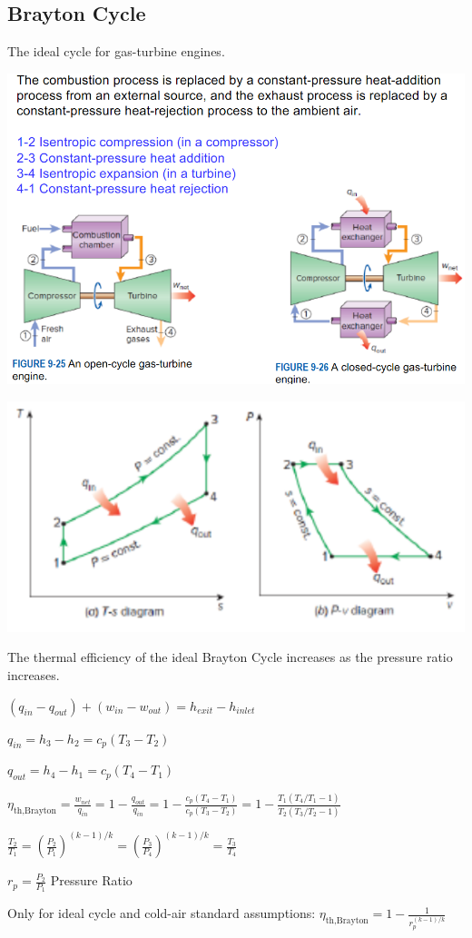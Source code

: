 \documentclass{article}
\begin{document}
\begin{multicols}{3}
    \subsection*{Brayton Cycle}
    The ideal cycle for gas-turbine engines.\par 
    \includegraphics[width=\linewidth]{Images/Brayton.png}\par 
    \includegraphics[width=\linewidth]{Images/Brayton2.png}\par 
    The thermal efficiency of the ideal Brayton Cycle increases as the pressure ratio increases.\par
    $(q_{in}-q_{out})+(w_{in}-w_{out})=h_{exit}-h_{inlet}$\par 
    $q_{in}=h_3-h_2=c_p(T_3-T_2)$\par 
    $q_{out}=h_4-h_1=c_p(T_4-T_1)$\par 
    $\eta_\text{th,Brayton}=\frac{w_{net}}{q_{in}}=1-\frac{q_{out}}{q_{in}}=1-\frac{c_p(T_4-T_1)}{c_p(T_3-T_2)}=1-\frac{T_1(T_4/T_1-1)}{T_2(T_3/T_2-1)}$\par 
    $\frac{T_2}{T_1}=\left(\frac{P_2}{P_1}\right)^{(k-1)/k}=\left(\frac{P_3}{P_4}\right)^{(k-1)/k}=\frac{T_3}{T_4}$\par 
    $r_p=\frac{P_2}{P_1}$ Pressure Ratio\par
    Only for ideal cycle and cold-air standard assumptions: $\eta_\text{th,Brayton}=1-\frac{1}{r_p^{(k-1)/k}}$

\end{multicols}
\end{document}
